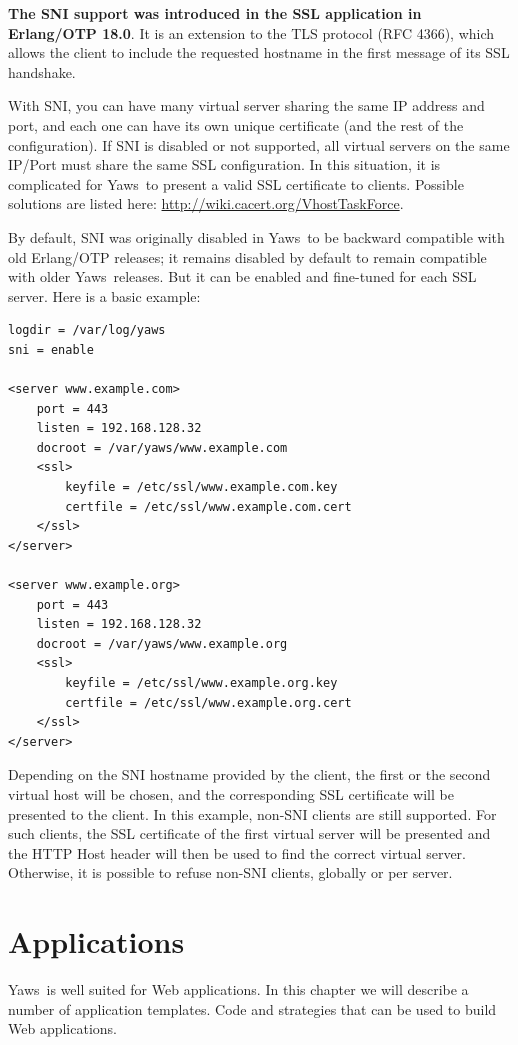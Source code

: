\documentclass[11pt,oneside,english]{book}
\newcommand{\Yaws}            %
        {{\sc Yaws}}
\begin{document}
\textbf{The SNI support was introduced in the SSL application in
  Erlang/OTP 18.0}. It is an extension to the TLS protocol (RFC 4366),
which allows the client to include the requested hostname in the first
message of its SSL handshake.

With SNI, you can have many virtual server sharing the same IP address
and port, and each one can have its own unique certificate (and the rest
of the configuration). If SNI is disabled or not supported, all virtual
servers on the same IP/Port must share the same SSL configuration. In
this situation, it is complicated for \Yaws\ to present a valid SSL
certificate to clients. Possible solutions are listed here:
\url{http://wiki.cacert.org/VhostTaskForce}.

By default, SNI was originally disabled in \Yaws\ to be backward
compatible with old Erlang/OTP releases; it remains disabled by
default to remain compatible with older \Yaws\ releases. But it can be
enabled and fine-tuned for each SSL server. Here is a basic example:


\begin{verbatim}
logdir = /var/log/yaws
sni = enable

<server www.example.com>
    port = 443
    listen = 192.168.128.32
    docroot = /var/yaws/www.example.com
    <ssl>
        keyfile = /etc/ssl/www.example.com.key
        certfile = /etc/ssl/www.example.com.cert
    </ssl>
</server>

<server www.example.org>
    port = 443
    listen = 192.168.128.32
    docroot = /var/yaws/www.example.org
    <ssl>
        keyfile = /etc/ssl/www.example.org.key
        certfile = /etc/ssl/www.example.org.cert
    </ssl>
</server>
\end{verbatim}

Depending on the SNI hostname provided by the client, the first or the
second virtual host will be chosen, and the corresponding SSL
certificate will be presented to the client. In this example, non-SNI
clients are still supported. For such clients, the SSL certificate of
the first virtual server will be presented and the HTTP Host header will
then be used to find the correct virtual server. Otherwise, it is
possible to refuse non-SNI clients, globally or per server.


\chapter{Applications}

\Yaws\  is well suited for Web applications. In this chapter we will
describe a number of application templates. Code and strategies that
can be used to build Web applications.
\end{document}
